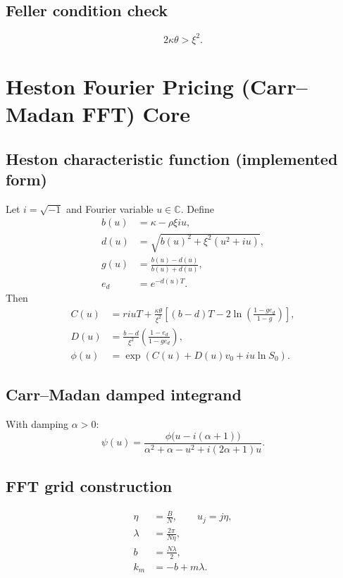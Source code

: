 \documentclass[11pt]{article}
\begin{document}
\subsection{Feller condition check}
\begin{equation}
2\kappa\theta > \xi^2.
\end{equation}

\section{Heston Fourier Pricing (Carr--Madan FFT) Core}

\subsection{Heston characteristic function (implemented form)}
Let $i=\sqrt{-1}$ and Fourier variable $u\in\mathbb{C}$. Define
\begin{align}
 b(u) &= \kappa - \rho\xi i u,\\
 d(u) &= \sqrt{b(u)^2 + \xi^2(u^2+iu)},\\
 g(u) &= \frac{b(u)-d(u)}{b(u)+d(u)},\\
 e_d &= e^{-d(u)T}.
\end{align}
Then
\begin{align}
 C(u) &= riuT + \frac{\kappa\theta}{\xi^2}\left[(b-d)T -2\ln\left(\frac{1-ge_d}{1-g}\right)\right],\\
 D(u) &= \frac{b-d}{\xi^2}\left(\frac{1-e_d}{1-ge_d}\right),\\
 \phi(u) &= \exp\!\left(C(u)+D(u)v_0 + iu\ln S_0\right).
\end{align}

\subsection{Carr--Madan damped integrand}
With damping $\alpha>0$:
\begin{equation}
\psi(u)=\frac{\phi\big(u-i(\alpha+1)\big)}{\alpha^2+\alpha-u^2+i(2\alpha+1)u}.
\end{equation}

\subsection{FFT grid construction}
\begin{align}
\eta &= \frac{B}{N}, \qquad u_j=j\eta,\\
\lambda &= \frac{2\pi}{N\eta},\\
 b &= \frac{N\lambda}{2},\\
 k_m &= -b + m\lambda.
\end{align}
\end{document}
